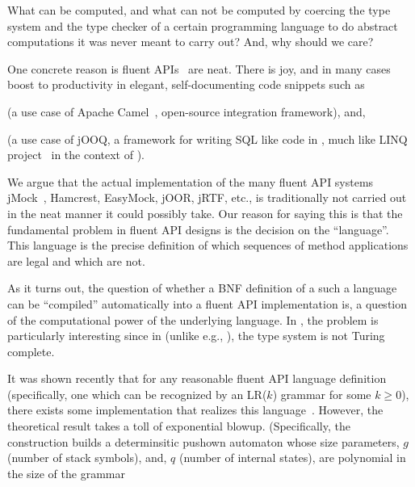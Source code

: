 What can be computed, and what can not be computed by coercing the type system
and the type checker of a certain programming language to do abstract
computations it was never meant to carry out? And, why should we care? 

One concrete reason is fluent
APIs~\cite{VanDeursen:Klint:2000,Hudak:1997,Fowler:2010} are neat. 
There is joy, and in many cases boost to productivity
  in elegant,  self-documenting code snippets such as
\begin{quote}
  \label{figure:DSL}
  \parbox[c]{44ex}{}
\end{quote}
(a use case of Apache Camel~\cite{Ibsen:Anstey:10}, open-source integration
framework), and,
\begin{quote}
\end{quote}
(a use case of jOOQ, a framework for writing
SQL like code in \Java, much like LINQ project~\cite{Meijer:Beckman:Bierman:06}
in the context of \CSharp).

We argue that 
  the actual implementation of the many fluent API systems
jMock~\cite{Freeman:Pryce:06},
Hamcrest,
EasyMock,
jOOR,
jRTF,
etc., is traditionally not carried out
in the neat manner it could possibly take.
Our reason for saying this is that the fundamental problem in 
  fluent API designs is the decision on the ``language''.  
This language is the precise definition of which sequences of method
applications are legal and which are not.

As it turns out, the question of whether a BNF definition of a such a language
can be ``compiled'' automatically into a fluent API implementation is, a
question of the computational power of the underlying language. In \Java, the problem
is particularly interesting since in \Java (unlike e.g., \CC\cite{Gutterman}),
the type system is not Turing complete.

It was shown recently that for any reasonable fluent API language definition
(specifically, one which can be recognized by an LR($k$) grammar for some $k
\ge 0$), there exists some \Java implementation that realizes this
language~\cite{GL}.
However, the theoretical result takes a toll of exponential blowup.
(Specifically, the construction builds a determinsitic pushown automaton 
whose size parameters, $g$ (number of stack symbols), and, $q$   (number of internal states), are polynomial in the size of the grammar
    

